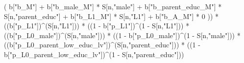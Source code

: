 \documentclass[
]{book}
\newenvironment{Shaded}{\begin{snugshade}}{\end{snugshade}}
\newcommand{\DecValTok}[1]{\textcolor[rgb]{0.00,0.00,0.81}{#1}}
\newcommand{\NormalTok}[1]{#1}
\newcommand{\SpecialCharTok}[1]{\textcolor[rgb]{0.00,0.00,0.00}{#1}}
\newcommand{\StringTok}[1]{\textcolor[rgb]{0.31,0.60,0.02}{#1}}
\begin{document}
\begin{Shaded}
\begin{Highlighting}[]
\NormalTok{          ( b[}\StringTok{"b\_M"}\NormalTok{] }\SpecialCharTok{+} 
\NormalTok{              b[}\StringTok{"b\_male\_M"}\NormalTok{] }\SpecialCharTok{*}\NormalTok{ S[n,}\StringTok{"male"}\NormalTok{] }\SpecialCharTok{+} 
\NormalTok{              b[}\StringTok{"b\_parent\_educ\_M"}\NormalTok{] }\SpecialCharTok{*}\NormalTok{ S[n,}\StringTok{"parent\_educ"}\NormalTok{] }\SpecialCharTok{+} 
\NormalTok{              b[}\StringTok{"b\_L1\_M"}\NormalTok{] }\SpecialCharTok{*}\NormalTok{ S[n,}\StringTok{"L1"}\NormalTok{] }\SpecialCharTok{+}
\NormalTok{              b[}\StringTok{"b\_A\_M"}\NormalTok{] }\SpecialCharTok{*} \DecValTok{0}\NormalTok{ )) }\SpecialCharTok{*} 
\NormalTok{      ((b[}\StringTok{"p\_L1"}\NormalTok{])}\SpecialCharTok{\^{}}\NormalTok{(S[n,}\StringTok{"L1"}\NormalTok{])) }\SpecialCharTok{*}
\NormalTok{      ((}\DecValTok{1} \SpecialCharTok{{-}}\NormalTok{ b[}\StringTok{"p\_L1"}\NormalTok{])}\SpecialCharTok{\^{}}\NormalTok{(}\DecValTok{1} \SpecialCharTok{{-}}\NormalTok{ S[n,}\StringTok{"L1"}\NormalTok{])) }\SpecialCharTok{*}
\NormalTok{      ((b[}\StringTok{"p\_L0\_male"}\NormalTok{])}\SpecialCharTok{\^{}}\NormalTok{(S[n,}\StringTok{"male"}\NormalTok{])) }\SpecialCharTok{*} 
\NormalTok{      ((}\DecValTok{1} \SpecialCharTok{{-}}\NormalTok{ b[}\StringTok{"p\_L0\_male"}\NormalTok{])}\SpecialCharTok{\^{}}\NormalTok{(}\DecValTok{1} \SpecialCharTok{{-}}\NormalTok{ S[n,}\StringTok{"male"}\NormalTok{])) }\SpecialCharTok{*} 
\NormalTok{      ((b[}\StringTok{"p\_L0\_parent\_low\_educ\_lv"}\NormalTok{])}\SpecialCharTok{\^{}}\NormalTok{(S[n,}\StringTok{"parent\_educ"}\NormalTok{])) }\SpecialCharTok{*}
\NormalTok{      ((}\DecValTok{1} \SpecialCharTok{{-}}\NormalTok{ b[}\StringTok{"p\_L0\_parent\_low\_educ\_lv"}\NormalTok{])}\SpecialCharTok{\^{}}\NormalTok{(}\DecValTok{1} \SpecialCharTok{{-}}\NormalTok{ S[n,}\StringTok{"parent\_educ"}\NormalTok{])) }
    

\end{Highlighting}
\end{Shaded}
\end{document}

